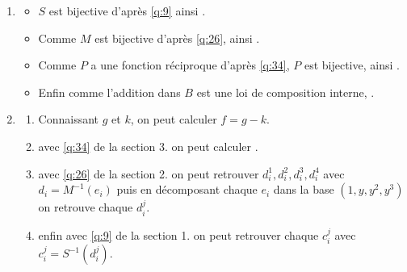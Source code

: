 \documentclass[a4paper, 12pt]{article}
\begin{document}
\begin{enumerate}[label=\textbf{Question \arabic*.}, leftmargin=*]

    \item \begin{itemize}
        \item $S$ est bijective d'après \ref{q:9} ainsi .
        \item Comme $M$ est bijective d'après \ref{q:26}, ainsi .
        \item Comme $P$ a une fonction réciproque d'après \ref{q:34}, $P$ est bijective, ainsi .
        \item Enfin comme l'addition dans $B$ est une loi de composition interne, .
    \end{itemize}
    \item \begin{enumerate}[label=\arabic*.]
        \item Connaissant $g$ et $k$, on peut calculer $f = g - k$.
        \item avec \ref{q:34} de la section 3. on peut calculer .
        \item avec \ref{q:26} de la section 2. on peut retrouver $d_i^1, d_i^2, d_i^3, d_i^4$ avec
        $d_i = M^{-1}(e_i)$ puis en décomposant chaque $e_i$ dans la base $(1, y, y^2, y^3)$ on retrouve chaque $d_i^j$.
        \item enfin avec \ref{q:9} de la section 1. on peut retrouver chaque $c_i^j$ avec $c_i^j = S^{-1}(d_i^j)$.
    \end{enumerate}
\end{enumerate}
\end{document}
